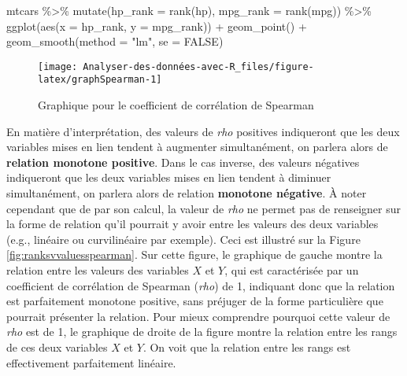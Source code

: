 \documentclass[
]{book}
\newenvironment{Shaded}{\begin{snugshade}}{\end{snugshade}}
\newcommand{\AttributeTok}[1]{\textcolor[rgb]{0.77,0.63,0.00}{#1}}
\newcommand{\ConstantTok}[1]{\textcolor[rgb]{0.00,0.00,0.00}{#1}}
\newcommand{\FunctionTok}[1]{\textcolor[rgb]{0.00,0.00,0.00}{#1}}
\newcommand{\NormalTok}[1]{#1}
\newcommand{\SpecialCharTok}[1]{\textcolor[rgb]{0.00,0.00,0.00}{#1}}
\newcommand{\StringTok}[1]{\textcolor[rgb]{0.31,0.60,0.02}{#1}}
\begin{document}
\begin{Shaded}
\begin{Highlighting}[]
\NormalTok{mtcars }\SpecialCharTok{\%\textgreater{}\%}
  \FunctionTok{mutate}\NormalTok{(}\AttributeTok{hp\_rank =} \FunctionTok{rank}\NormalTok{(hp), }\AttributeTok{mpg\_rank =} \FunctionTok{rank}\NormalTok{(mpg)) }\SpecialCharTok{\%\textgreater{}\%}
  \FunctionTok{ggplot}\NormalTok{(}\FunctionTok{aes}\NormalTok{(}\AttributeTok{x =}\NormalTok{ hp\_rank, }\AttributeTok{y =}\NormalTok{ mpg\_rank)) }\SpecialCharTok{+}
  \FunctionTok{geom\_point}\NormalTok{() }\SpecialCharTok{+}
  \FunctionTok{geom\_smooth}\NormalTok{(}\AttributeTok{method =} \StringTok{"lm"}\NormalTok{, }\AttributeTok{se =} \ConstantTok{FALSE}\NormalTok{)}
\end{Highlighting}
\end{Shaded}

\begin{figure}

{\centering \texttt{[image: Analyser-des-données-avec-R\_files/figure-latex/graphSpearman-1]} 

}

\caption{Graphique pour le coefficient de corrélation de Spearman}\label{fig:graphSpearman}
\end{figure}

En matière d'interprétation, des valeurs de \emph{rho} positives indiqueront que les deux variables mises en lien tendent à augmenter simultanément, on parlera alors de \textbf{relation monotone positive}. Dans le cas inverse, des valeurs négatives indiqueront que les deux variables mises en lien tendent à diminuer simultanément, on parlera alors de relation \textbf{monotone négative}. À noter cependant que de par son calcul, la valeur de \emph{rho} ne permet pas de renseigner sur la forme de relation qu'il pourrait y avoir entre les valeurs des deux variables (e.g., linéaire ou curvilinéaire par exemple). Ceci est illustré sur la Figure \ref{fig:ranksvvaluesspearman}. Sur cette figure, le graphique de gauche montre la relation entre les valeurs des variables \(X\) et \(Y\), qui est caractérisée par un coefficient de corrélation de Spearman (\emph{rho}) de 1, indiquant donc que la relation est parfaitement monotone positive, sans préjuger de la forme particulière que pourrait présenter la relation. Pour mieux comprendre pourquoi cette valeur de \emph{rho} est de 1, le graphique de droite de la figure montre la relation entre les rangs de ces deux variables \(X\) et \(Y\). On voit que la relation entre les rangs est effectivement parfaitement linéaire.
\end{document}
